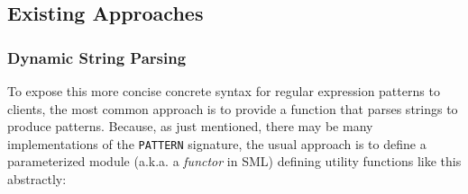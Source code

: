 

\subsection{Existing Approaches}\label{sec:syntax-existing}\label{sec:syntax-existing-approaches}
\subsubsection{Dynamic String Parsing}
To expose this more concise concrete syntax for regular expression patterns to clients, the most common approach is to provide a function that parses strings to produce patterns. Because, as just mentioned, there  may be many implementations of the \lstinline{PATTERN} signature, the usual approach is to define a parameterized module (a.k.a. a \emph{functor} in SML) defining utility functions like this abstractly:

